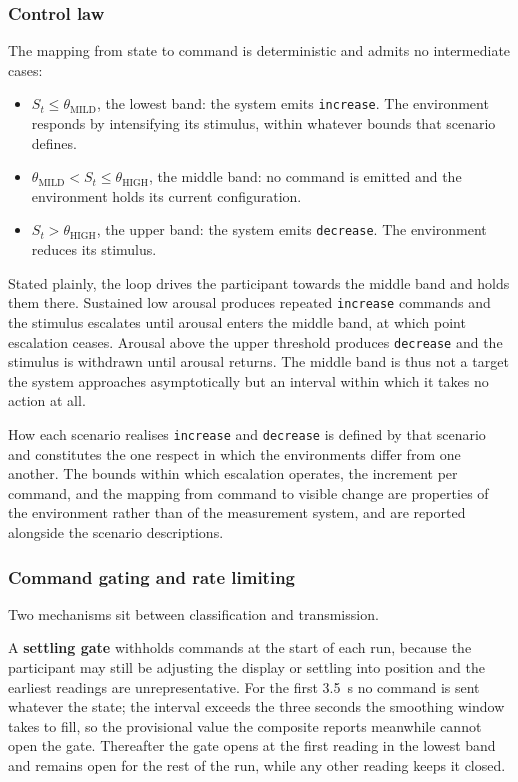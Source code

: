 \subsubsection{Control law}
\label{sec:controllaw}

The mapping from state to command is deterministic and admits no
intermediate cases:

\begin{itemize}
    \item $S_{t} \le \theta_{\mathrm{MILD}}$, the lowest band:
    the system emits \texttt{increase}. The environment responds
    by intensifying its stimulus, within whatever bounds that
    scenario defines.
    \item $\theta_{\mathrm{MILD}} < S_{t} \le \theta_{\mathrm{HIGH}}$,
    the middle band: no command is emitted and the environment
    holds its current configuration.
    \item $S_{t} > \theta_{\mathrm{HIGH}}$, the upper band: the
    system emits \texttt{decrease}. The environment reduces its
    stimulus.
\end{itemize}

Stated plainly, the loop drives the participant towards the
middle band and holds them there. Sustained low arousal produces
repeated \texttt{increase} commands and the stimulus escalates
until arousal enters the middle band, at which point escalation
ceases. Arousal above the upper threshold produces
\texttt{decrease} and the stimulus is withdrawn until arousal
returns. The middle band is thus not a target the system
approaches asymptotically but an interval within which it takes
no action at all.

How each scenario realises \texttt{increase} and
\texttt{decrease} is defined by that scenario and constitutes the
one respect in which the environments differ from one another.
The bounds within which escalation operates, the increment per
command, and the mapping from command to visible change are
properties of the environment rather than of the measurement
system, and are reported alongside the scenario descriptions.

\subsubsection{Command gating and rate limiting}
\label{sec:gating}

Two mechanisms sit between classification and transmission.

A \textbf{settling gate} withholds commands at the start of each
run, because the participant may still be adjusting the display
or settling into position and the earliest readings are
unrepresentative. For the first 3.5~s no command is sent whatever
the state; the interval exceeds the three seconds the smoothing
window takes to fill, so the provisional value the composite
reports meanwhile cannot open the gate. Thereafter the gate opens
at the first reading in the lowest band and remains open for the
rest of the run, while any other reading keeps it closed.

